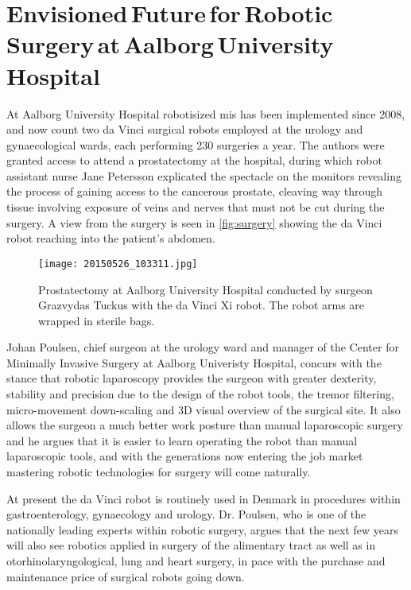 \vspace{-1mm}
\section[Envisioned Future for Robotic Surgery at Aalborg University Hospital]{Envisioned\,Future\,for\,Robotic\,Surgery\,at\,Aalborg\,University\,Hospital}\label{sec:aau_doc}

\vspace{-2mm}
At Aalborg University Hospital robotisized \gls{mis} has been implemented since 2008, and now count two da Vinci surgical robots employed at the urology and gynaecological wards, each performing 230 surgeries a year. %
The authors were granted access to attend a prostatectomy at the hospital, during which robot assistant nurse Jane Petersson explicated the spectacle on the monitors revealing the process of gaining access to the cancerous prostate, cleaving way through tissue involving exposure of veins and nerves that must not be cut during the surgery. A view from the surgery is seen in \autoref{fig:surgery} showing the da Vinci robot reaching into the patient's abdomen.
\begin{figure}[htbp]
	\centering
	\texttt{[image: 20150526\_103311.jpg]}
	\caption{Prostatectomy at Aalborg University Hospital conducted by surgeon Grazvydas Tuckus with the da Vinci Xi robot. The robot arms are wrapped in sterile bags.}
	\label{fig:surgery}
\end{figure}

\phantom{.}

\vspace{-12mm}
Johan Poulsen, chief surgeon at the urology ward and manager of the Center for Minimally Invasive Surgery at Aalborg Univeristy Hospital, concurs with the stance that robotic laparoscopy provides the surgeon with greater dexterity, stability and precision due to the design of the robot tools, the tremor filtering, micro-movement down-scaling %
and 3D visual overview of the surgical site.  %
It also allows the surgeon a much better work posture than manual laparoscopic surgery and he argues that it is easier to learn operating the robot than manual laparoscopic tools, %
and with the generations now entering the job market mastering  robotic technologies for surgery will come naturally.

At present the da Vinci robot is routinely used in Denmark in procedures within gastroenterology, gynaecology and urology. Dr. Poulsen, who is one of the nationally leading experts within robotic surgery, argues that the next few years will also see robotics applied in surgery of the alimentary tract as well as in otorhinolaryngological, lung and heart surgery, in pace with the purchase and maintenance price of surgical robots going down.

